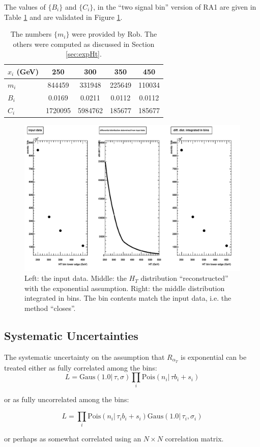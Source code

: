 The values of $\{B_i\}$ and $\{C_i\}$, in the ``two signal bin'' version of RA1 are given in Table \ref{tab:bsandcs}
and are validated in Figure \ref{fig:validationPlots}.
\begin{table}[hb]
  \begin{tabular}{| l | c c c c |}
    \hline
    $x_i$ (GeV) & 250 & 300 & 350 & 450 \\
    \hline
    $m_i$ & 844459 & 331948 & 225649 & 110034 \\
    $B_i$ & 0.0169 & 0.0211 & 0.0112 & 0.0112 \\
    $C_i$ & 1720095 & 5984762 & 185677 & 185677 \\
    \hline
  \end{tabular}
  \caption{The numbers $\{m_i\}$ were provided by Rob.  The others were computed as discussed in Section \ref{sec:expHt}.}
  \label{tab:bsandcs}
\end{table}

\begin{figure}[ht]
  \includegraphics[width=1.2\textwidth]{totalBackgroundExpHt}
  \caption{Left: the input data.
    Middle: the $H_T$ distribution ``reconstructed'' with the exponential assumption.
    Right: the middle distribution integrated in bins.  The bin contents match the input data, i.e. the method ``closes''.}
  \label{fig:validationPlots}
\end{figure}

\subsection{Systematic Uncertainties}
\label{sec:sysUnc}
The systematic uncertainty on the assumption that $R_{\alpha_T}$ is exponential can be treated either as 
fully correlated among the bins:
\begin{equation}
L=\mathrm{Gaus}(1.0 |\,\tau, \sigma)\prod_i \mathrm{Pois}(n_i |\, \tau b_i + s_i)
\end{equation}

or as fully uncorrelated among the bins:

\begin{equation}
L=\prod_i \mathrm{Pois}(n_i |\, \tau_i b_i + s_i)\mathrm{Gaus}(1.0 |\,\tau_i, \sigma_i)
\end{equation}

or perhaps as somewhat correlated using an $N \times N$ correlation matrix.
